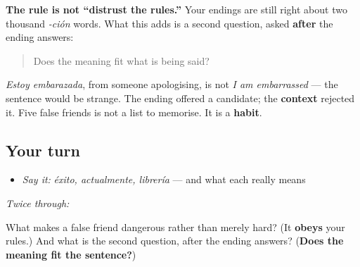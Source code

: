 \begin{culture}
\textbf{The rule is not \textquotedblleft{}distrust the rules.\textquotedblright{}} Your endings are still right about two thousand \emph{-ción} words. What this adds is a second question, asked \textbf{after} the ending answers:

\begin{quote}
Does the meaning fit what is being said?
\end{quote}

\emph{Estoy embarazada}, from someone apologising, is not \emph{I am embarrassed} — the sentence would be strange. The ending offered a candidate; the \textbf{context} rejected it. Five false friends is not a list to memorise. It is a \textbf{habit}.
\end{culture}

\subsection*{Your turn}
\begin{itemize}
\raggedright
  \item \emph{Say it:} \emph{éxito, actualmente, librería} — and what each really means
\end{itemize}

\emph{Twice through:}

\begin{tcolorbox}[breakable,colback=teal!4,colframe=teal!35!black,title={Before you move on}]
What makes a false friend dangerous rather than merely hard? (It \textbf{obeys} your rules.) And what is the second question, after the ending answers? (\textbf{Does the meaning fit the sentence?})
\end{tcolorbox}
